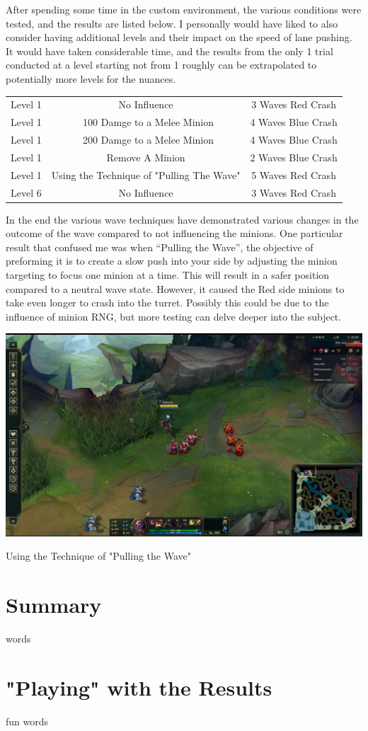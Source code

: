 \documentclass{article}
\begin{document}
After spending some time in the custom environment, the various conditions were tested, and the results are listed below. I personally would have liked to also consider having additional levels and their impact on the speed of lane pushing. It would have taken considerable time, and the results from the only 1 trial conducted at a level starting not from 1 roughly can be extrapolated to potentially more levels for the nuances.
\begin{center}
\begin{tabular}{ c c c}
  Level 1 & No Influence & 3 Waves Red Crash\\ 
  Level 1 & ~100 Damge to  a Melee Minion & 4 Waves Blue Crash\\  
  Level 1 & ~200 Damge to  a Melee Minion & 4 Waves Blue Crash\\  
  Level 1 & Remove A Minion & 2 Waves Blue Crash\\  
  Level 1 & Using the Technique of "Pulling The Wave"  & 5 Waves Red Crash\\
  Level 6 & No Influence  & 3 Waves Red Crash
\end{tabular}
\end{center}
In the end the various wave techniques have demonstrated various changes in the outcome of the wave compared to not influencing the minions. One particular result that confused me was when “Pulling the Wave”, the objective of preforming it is to create a slow push into your side by adjusting the minion targeting to focus one minion at a time. This will result in a safer position compared to a neutral wave state. However, it caused the Red side minions to take even longer to crash into the turret. Possibly this could be due to the influence of minion RNG, but more testing can delve deeper into the subject.
\begin{table}[h]
  \includegraphics[width=\textwidth]{PullingTheWave.PNG}
  \caption[Pulling the Wave]{Using the Technique of "Pulling the Wave"}
  \end{table}

\newpage
\section{Summary}
words\\


\newpage
\section{"Playing" with the Results}
fun words
\end{document}

